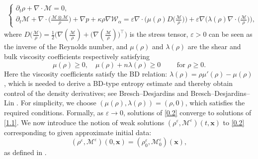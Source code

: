 \documentclass[reqno,11pt]{amsart}
\numberwithin{equation}{section}
\theoremstyle{definition}
\def\M{{\mathcal{M}}}
\begin{document}
\begin{align}\label{0.2}
\begin{cases}
\displaystyle
\partial_t \rho+\nabla \cdot \M=0, \\[1mm]
\displaystyle
\partial_t \M+ \nabla \cdot \Big(\frac{\M\otimes\M}{\rho}\Big)
+\nabla p + \kappa \rho \nabla \mathcal{W}_\alpha
= \varepsilon \nabla \cdot \Big(\mu(\rho)D \big(\frac{\M}{\rho} \big) \Big)
+ \varepsilon \nabla \Big( \lambda(\rho) \nabla \cdot \big(\frac{\M}{\rho} \big) \Big),
\end{cases}
\end{align}
 where $D\big( \frac{\M}{\rho} \big)
 = \frac{1}{2} \big( \nabla (\frac{\M}{\rho})
  + \big(\nabla ( \frac{\M}{\rho}) \big)^\intercal \big)$
is the stress tensor,
$\varepsilon > 0$ can be seen as the inverse of the Reynolds number,
and $\mu(\rho)$ and $\lambda(\rho)$ are the shear and bulk viscosity coefficients respectively
satisfying
 \[
 \mu(\rho) \geq 0, \quad \mu(\rho) + n\lambda(\rho) \geq 0 \qquad \text{ for $\rho \geq 0$}.
 \]
Here the viscosity coefficients satisfy the BD relation:
$\lambda(\rho) = \rho \mu'(\rho) - \mu(\rho)$,
which is needed to derive a BD-type entropy estimate and thereby obtain 
control of the density derivatives; see Bresch–Desjardins \cite{Bresch02} and Bresch–Desjardins–Lin \cite{Bresch_2003}. For simplicity, we choose
$(\mu(\rho),\lambda(\rho)) = (\rho,0)$, 
which satisfies the required conditions. Formally,
as $\varepsilon \to 0$, solutions of \eqref{0.2} converge to solutions of \eqref{1.1}. 
We now introduce the notion of weak solutions
$(\rho^\varepsilon,\M^\varepsilon)(t,\boldsymbol{x})$ 
to \eqref{0.2} corresponding to given approximate initial data:
\begin{equation}\label{initialns}
    (\rho^\varepsilon, \M^\varepsilon)(0,\boldsymbol{x}) = (\rho^\varepsilon_0, \M^\varepsilon_0)(\boldsymbol{x}),
\end{equation}
as defined in \cite[Appendix B]{Carrillo2025}.
\end{document}
